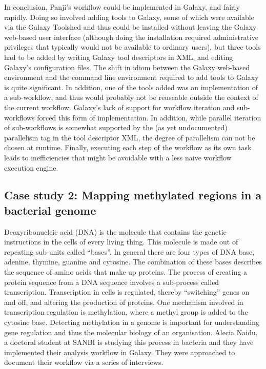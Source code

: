 \documentclass[a4paper,10pt]{scrreprt}
\begin{document}
In conclusion, Panji's workflow could be implemented in Galaxy, and fairly rapidly. Doing so involved adding tools to Galaxy, some of which were available via the Galaxy Toolshed and thus could be installed without leaving the Galaxy web-based user interface (although doing the installation required administrative privileges that typically would not be available to ordinary users), but three tools had to be added by writing Galaxy tool descriptors in XML, and editing Galaxy's configuration files. The shift in idiom between the Galaxy web-based environment and the command line environment required to add tools to Galaxy is quite significant. In addition, one of the tools added was an implementation of a sub-workflow, and thus would probably not be reuseable outside the context of the current workflow. Galaxy's lack of support for workflow iteration and sub-workflows forced this form of implementation. In addition, while parallel iteration of sub-workflows is somewhat supported by the (as yet undocumented) 
parallelism tag in the tool descriptor XML, the degree of parallelism can not be chosen at runtime. Finally, executing each step of the workflow as its own task leads to inefficiencies that might be avoidable with a less naive workflow execution engine.





  
\subsection{Case study 2: Mapping methylated regions in a bacterial genome}

Deoxyribonucleic acid (DNA) is the molecule that contains the genetic instructions in the cells of every living thing. This molecule is made out of repeating sub-units called ``bases''. In general there are four types of DNA base, adenine, thymine, guanine and cytosine. The combination of these bases describes the sequence of amino acids that make up proteins. The process of creating a protein sequence from a DNA sequence involves a sub-process called transcription. Transcription in cells is regulated, thereby ``switching'' genes on and off, and altering the production of proteins. One mechanism involved in transcription regulation is methylation, where a methyl group is added to the cytosine base. Detecting methylation in a genome is important for understanding gene regulation and thus the molecular biology of an organisation. Alecia Naidu, a doctoral student at SANBI is studying this process in bacteria and they have implemented their analysis workflow in Galaxy. They were approached to document their 
workflow via a series of interviews.
\end{document}

